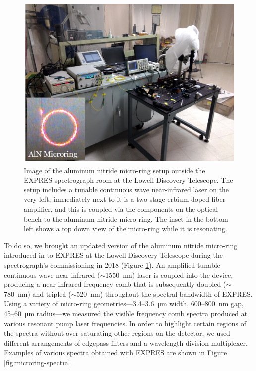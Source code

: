 \begin{figure}
    \centering
    \includegraphics[width=\textwidth]{figures-3/microring-setup.png}
    \caption[Aluminum nitride micro-ring at the Lowell Discovery Telescope]{Image of the aluminum nitride micro-ring setup outside the EXPRES spectrograph room at the Lowell Discovery Telescope. The setup includes a tunable continuous wave near-infrared laser on the very left, immediately next to it is a two stage erbium-doped fiber amplifier, and this is coupled via the components on the optical bench to the aluminum nitride micro-ring. The inset in the bottom left shows a top down view of the micro-ring while it is resonating.}
    \label{fig:microring-setup}
\end{figure}

To do so, we brought an updated version of the aluminum nitride micro-ring introduced in \citet{jung_green_2014} to EXPRES at the Lowell Discovery Telescope during the spectrograph's commissioning in 2018 (Figure \ref{fig:microring-setup}). An amplified tunable continuous-wave near-infrared ($\sim$1550~\si{\nano\meter}) laser is coupled into the device, producing a near-infrared frequency comb that is subsequently doubled ($\sim$780~\si{\nano\meter}) and tripled ($\sim$520~\si{\nano\meter}) throughout the spectral bandwidth of EXPRES. Using a variety of micro-ring geometries---3.4--3.6~\si{\micro\meter} width, 600--800~\si{\nano\meter} gap, 45--60~\si{\micro\meter} radius---we measured the visible frequency comb spectra produced at various resonant pump laser frequencies. In order to highlight certain regions of the spectra without over-saturating other regions on the detector, we used different arrangements of edgepass filters and a wavelength-division multiplexer. Examples of various spectra obtained with EXPRES are shown in Figure \ref{fig:microring-spectra}.

